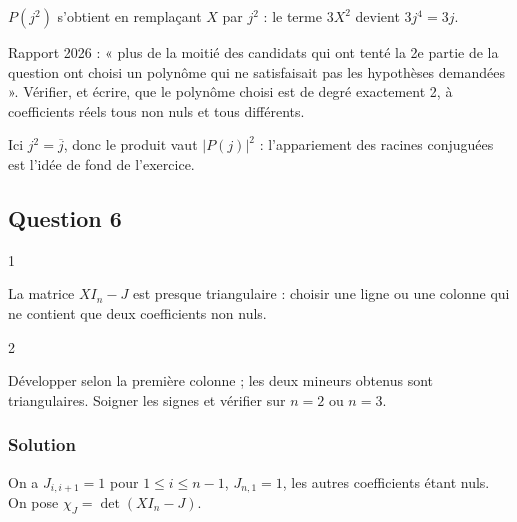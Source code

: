 \documentclass[11pt,a4paper]{article}
\begin{document}
\begin{piege}

\(P(j^2)\) s'obtient en remplaçant \(X\) par \(j^2\) : le terme \(3X^2\) devient \(3j^4=3j\).

\end{piege}

\begin{jury}

Rapport 2026 : « plus de la moitié des candidats qui ont tenté la 2e partie de la question ont choisi un polynôme qui ne satisfaisait pas les hypothèses demandées ». Vérifier, et écrire, que le polynôme choisi est de degré exactement 2, à coefficients réels tous non nuls et tous différents.

\end{jury}

\begin{methode}

Ici \(j^2=\overline j\), donc le produit vaut \(|P(j)|^2\) : l'appariement des racines conjuguées est l'idée de fond de l'exercice.

\end{methode}

\hypertarget{question-6}{%
\subsection{Question 6}\label{question-6}}

\begin{indication}{1}

La matrice \(XI_n-J\) est presque triangulaire : choisir une ligne ou une colonne qui ne contient que deux coefficients non nuls.

\end{indication}

\begin{indication}{2}

Développer selon la première colonne ; les deux mineurs obtenus sont triangulaires. Soigner les signes et vérifier sur \(n=2\) ou \(n=3\).

\end{indication}

\hypertarget{solution-5}{%
\subsubsection{Solution}\label{solution-5}}

On a \(J_{i,i+1}=1\) pour \(1\le i\le n-1\), \(J_{n,1}=1\), les autres coefficients étant nuls. On pose \(\chi_J=\det(XI_n-J)\).
\end{document}
